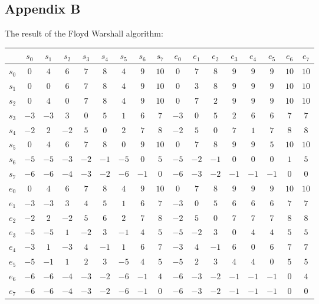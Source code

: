 \documentclass{article}
\theoremstyle{definition}
\begin{document}
\subsection*{Appendix B}
\label{appendix:b}
The result of the Floyd Warshall algorithm:\\
\begin{tabular}{c | cccccccccccccccc}
	&$s_0$	&$s_1$ &$s_2$ &$s_3$ &$s_4$ &$s_5$ &$s_6$ &$s_7$ &$e_0$ &$e_1$ &$e_2$ &$e_3$ &$e_4$ &$e_5$ &$e_6$ &$e_7$\\
\hline
$s_0$	&$0$	&$4$	&$6$	&$7$	&$8$	&$4$	&$9$	&$10$	&$0$	&$7$	&$8$	&$9$	&$9$	&$9$	&$10$	&$10$	\\
$s_1$	&$0$	&$0$	&$6$	&$7$	&$8$	&$4$	&$9$	&$10$	&$0$	&$3$	&$8$	&$9$	&$9$	&$9$	&$10$	&$10$	\\
$s_2$	&$0$	&$4$	&$0$	&$7$	&$8$	&$4$	&$9$	&$10$	&$0$	&$7$	&$2$	&$9$	&$9$	&$9$	&$10$	&$10$	\\
$s_3$	&$-3$	&$-3$	&$3$	&$0$	&$5$	&$1$	&$6$	&$7$	&$-3$	&$0$	&$5$	&$2$	&$6$	&$6$	&$7$	&$7$\\
$s_4$	&$-2$	&$2$	&$-2$	&$5$	&$0$	&$2$	&$7$	&$8$	&$-2$	&$5$	&$0$	&$7$	&$1$	&$7$	&$8$	&$8$\\
$s_5$	&$0$	&$4$	&$6$	&$7$	&$8$	&$0$	&$9$	&$10$	&$0$	&$7$	&$8$	&$9$	&$9$	&$5$	&$10$	&$10$	\\
$s_6$	&$-5$	&$-5$	&$-3$	&$-2$	&$-1$	&$-5$	&$0$	&$5$	&$-5$	&$-2$	&$-1$	&$0$	&$0$	&$0$	&$1$	&$5$\\
$s_7$	&$-6$	&$-6$	&$-4$	&$-3$	&$-2$	&$-6$	&$-1$	&$0$	&$-6$	&$-3$	&$-2$	&$-1$	&$-1$	&$-1$	&$0$	&$0$\\
$e_0$	&$0$	&$4$	&$6$	&$7$	&$8$	&$4$	&$9$	&$10$	&$0$	&$7$	&$8$	&$9$	&$9$	&$9$	&$10$	&$10$	\\
$e_1$	&$-3$	&$-3$	&$3$	&$4$	&$5$	&$1$	&$6$	&$7$	&$-3$	&$0$	&$5$	&$6$	&$6$	&$6$	&$7$	&$7$\\
$e_2$	&$-2$	&$2$	&$-2$	&$5$	&$6$	&$2$	&$7$	&$8$	&$-2$	&$5$	&$0$	&$7$	&$7$	&$7$	&$8$	&$8$\\
$e_3$	&$-5$	&$-5$	&$1$	&$-2$	&$3$	&$-1$	&$4$	&$5$	&$-5$	&$-2$	&$3$	&$0$	&$4$	&$4$	&$5$	&$5$\\
$e_4$	&$-3$	&$1$	&$-3$	&$4$	&$-1$	&$1$	&$6$	&$7$	&$-3$	&$4$	&$-1$	&$6$	&$0$	&$6$	&$7$	&$7$\\
$e_5$	&$-5$	&$-1$	&$1$	&$2$	&$3$	&$-5$	&$4$	&$5$	&$-5$	&$2$	&$3$	&$4$	&$4$	&$0$	&$5$	&$5$\\
$e_6$	&$-6$	&$-6$	&$-4$	&$-3$	&$-2$	&$-6$	&$-1$	&$4$	&$-6$	&$-3$	&$-2$	&$-1$	&$-1$	&$-1$	&$0$	&$4$\\
$e_7$	&$-6$	&$-6$	&$-4$	&$-3$	&$-2$	&$-6$	&$-1$	&$0$	&$-6$	&$-3$	&$-2$	&$-1$	&$-1$	&$-1$	&$0$	&$0$\\
\end{tabular}
\end{document}
